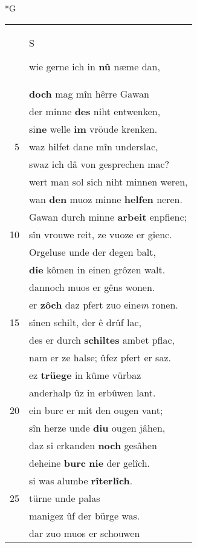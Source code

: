 \documentclass[8pt,a4paper,notitlepage]{article}
\begin{document}
\newpage
\begin{table}[ht]
\begin{minipage}[t]{0.5\linewidth}
\small
\begin{center}*G
\end{center}
\begin{tabular}{rl}
 & \begin{large}S\end{large}wie gerne ich in \textbf{nû} næme dan,\\ 
 & \textbf{doch} mag mîn hêrre Gawan\\ 
 & der minne \textbf{des} niht entwenken,\\ 
 & si\textbf{ne} welle \textbf{im} vröude krenken.\\ 
5 & waz hilfet dane mîn underslac,\\ 
 & swaz ich dâ von gesprechen mac?\\ 
 & wert man sol sich niht minnen weren,\\ 
 & wan \textbf{den} muoz minne \textbf{helfen} neren.\\ 
 & Gawan durch minne \textbf{arbeit} enpfienc;\\ 
10 & sîn vrouwe reit, ze vuoze er gienc.\\ 
 & Orgeluse unde der degen balt,\\ 
 & \textbf{die} kômen in einen grôzen walt.\\ 
 & dannoch muos er gêns wonen.\\ 
 & er \textbf{zôch} daz pfert zuo eine\textit{m} ronen.\\ 
15 & sînen schilt, der ê drûf lac,\\ 
 & des er durch \textbf{schiltes} ambet pflac,\\ 
 & nam er ze halse; ûfez pfert er saz.\\ 
 & ez \textbf{trüege} in kûme vürbaz\\ 
 & anderhalp ûz in erbûwen lant.\\ 
20 & ein burc er mit den ougen vant;\\ 
 & sîn herze unde \textbf{diu} ougen jâhen,\\ 
 & daz si erkanden \textbf{noch} gesâhen\\ 
 & deheine \textbf{burc} \textbf{nie} der gelîch.\\ 
 & si was alumbe \textbf{rîterlîch}.\\ 
25 & türne unde palas\\ 
 & manigez ûf der bürge was.\\ 
 & dar zuo muos er schouwen\\ 

\end{tabular}
\end{minipage}
\end{table}
\end{document}
